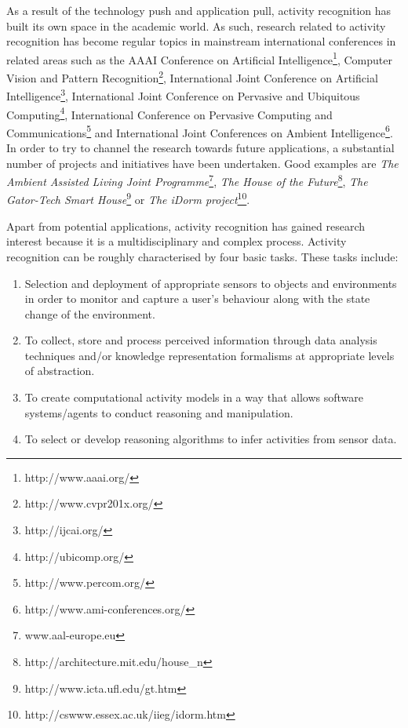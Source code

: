 As a result of the technology push and application pull, activity recognition has built its own space in the academic world. As such, research related to activity recognition has become regular topics in mainstream international conferences in related areas such as the AAAI Conference on Artificial Intelligence\footnote{http://www.aaai.org/}, Computer Vision and Pattern Recognition\footnote{http://www.cvpr201x.org/}, International Joint Conference on Artificial Intelligence\footnote{http://ijcai.org/}, International Joint Conference on Pervasive and Ubiquitous Computing\footnote{http://ubicomp.org/}, International Conference on Pervasive Computing and Communications\footnote{http://www.percom.org/} and International Joint Conferences on Ambient Intelligence\footnote{http://www.ami-conferences.org/}. In order to try to channel the research towards future applications, a substantial number of projects and initiatives have been undertaken. Good examples are \textit{The Ambient Assisted Living Joint Programme}\footnote{www.aal-europe.eu}, \textit{The House of the Future}\footnote{http://architecture.mit.edu/house\_n}, \textit{The Gator-Tech Smart House}\footnote{http://www.icta.ufl.edu/gt.htm} or \textit{The iDorm project}\footnote{http://cswww.essex.ac.uk/iieg/idorm.htm}.  %

Apart from potential applications, activity recognition has gained research interest because it is a multidisciplinary and complex process. Activity recognition can be roughly characterised by four basic tasks. These tasks include:
\begin{enumerate}
 \item Selection and deployment of appropriate sensors to objects and environments in order to monitor and capture a user’s behaviour along with the state change of the environment.
 \item To collect, store and process perceived information through data analysis techniques and/or knowledge representation formalisms at appropriate levels of abstraction.
 \item To create computational activity models in a way that allows software systems/agents to conduct reasoning and manipulation.
 \item To select or develop reasoning algorithms to infer activities from sensor data.
\end{enumerate}

